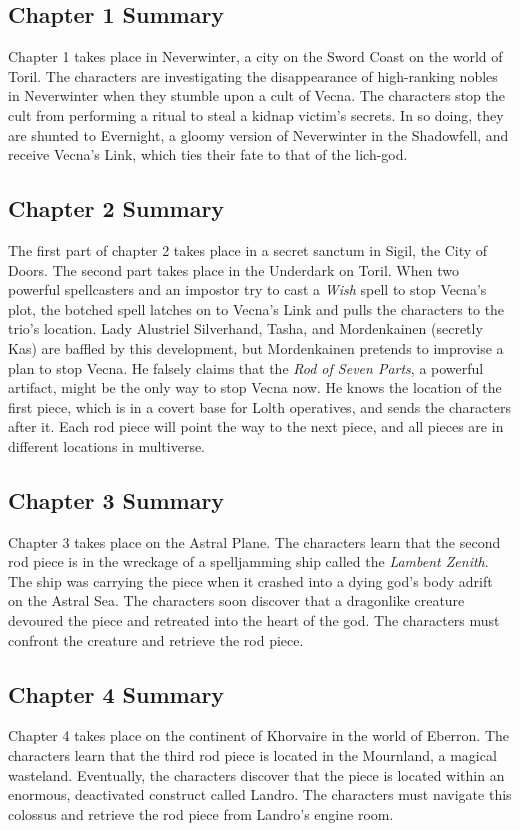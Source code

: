 \documentclass[10pt,a4paper,twoside,bg=print,twocolumn,openany,nodeprecatedcode]{dndbook}
\begin{document}
\subsection{Chapter 1 Summary}
Chapter 1 takes place in Neverwinter, a city on the Sword Coast on the world of Toril. The characters are investigating the disappearance of high-ranking nobles in Neverwinter when they stumble upon a cult of Vecna. The characters stop the cult from performing a ritual to steal a kidnap victim's secrets. In so doing, they are shunted to Evernight, a gloomy version of Neverwinter in the Shadowfell, and receive Vecna's Link, which ties their fate to that of the lich-god.

\subsection{Chapter 2 Summary}
The first part of chapter 2 takes place in a secret sanctum in Sigil, the City of Doors. The second part takes place in the Underdark on Toril. When two powerful spellcasters and an impostor try to cast a \textit{Wish} spell to stop Vecna's plot, the botched spell latches on to Vecna's Link and pulls the characters to the trio's location. Lady Alustriel Silverhand, Tasha, and Mordenkainen (secretly Kas) are baffled by this development, but Mordenkainen pretends to improvise a plan to stop Vecna. He falsely claims that the \textit{Rod of Seven Parts}, a powerful artifact, might be the only way to stop Vecna now. He knows the location of the first piece, which is in a covert base for Lolth operatives, and sends the characters after it. Each rod piece will point the way to the next piece, and all pieces are in different locations in multiverse.

\subsection{Chapter 3 Summary}
Chapter 3 takes place on the Astral Plane. The characters learn that the second rod piece is in the wreckage of a spelljamming ship called the \textit{Lambent Zenith}. The ship was carrying the piece when it crashed into a dying god's body adrift on the Astral Sea. The characters soon discover that a dragonlike creature devoured the piece and retreated into the heart of the god. The characters must confront the creature and retrieve the rod piece.

\subsection{Chapter 4 Summary}
Chapter 4 takes place on the continent of Khorvaire in the world of Eberron. The characters learn that the third rod piece is located in the Mournland, a magical wasteland. Eventually, the characters discover that the piece is located within an enormous, deactivated construct called Landro. The characters must navigate this colossus and retrieve the rod piece from Landro's engine room.
\end{document}
